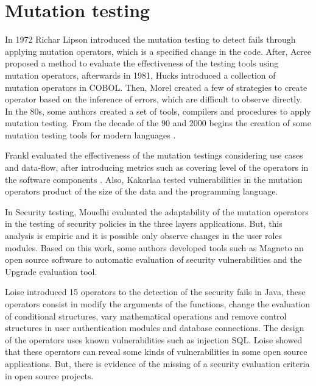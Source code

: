 

\section{Mutation testing}

In 1972 Richar Lipson introduced the mutation testing\cite{lipton1971fault} to detect fails through applying mutation operators, which is a specified change in the code. After, Acree\cite{10.5555/909622} proposed a method to evaluate the effectiveness of the testing tools using mutation operators, afterwards in 1981, Hucks\cite{Hanks80} introduced a collection of mutation operators in COBOL. Then, Morel\cite{10.5555/911352} created a few of strategies to create operator based on the inference of errors, which are difficult to observe directly. In the 80s, some authors created a set of tools, compilers and procedures to apply mutation testing\cite{10.5555/914857, Offutt1987}. From the decade of the 90 and 2000 begins the creation of some mutation testing tools for modern languages \cite{92910,170202, Maldonado2001}.

Frankl\cite{Frankl1991,Frankl1993} evaluated the effectiveness of the mutation testings considering use cases and data-flow, after introducing metrics such as covering level of the operators in the software components \cite{Offutt1996,Frankl1997,Frankl1998}. Also, Kakarlaa\cite{Kakarla2011} tested vulnerabilities in the mutation operators product of the size of the data and the programming language.

In Security testing, Mouelhi\cite{Mouelhi2007} evaluated the adaptability of the mutation operators in the testing of security policies in the three layers applications. But, this analysis is empiric and it is possible only observe changes in the user roles modules. Based on this work, some authors developed tools such as Magneto\cite{Thomas2011} an open source software to automatic evaluation of security vulnerabilities and the Upgrade evaluation tool\cite{ozdemir2019upgrade}.

Loise\cite{Loise2017} introduced 15 operators to the detection of the security fails in Java, these operators consist in modify the arguments of the functions, change the evaluation of conditional structures, vary mathematical operations and remove control structures in user authentication modules and database connections. The design of the operators uses known vulnerabilities such as injection SQL. Loise showed that these operators can reveal some kinds of vulnerabilities in some open source applications. But, there is evidence of the missing of a security evaluation criteria in open source projects. 

